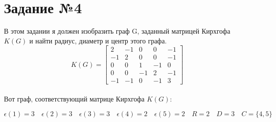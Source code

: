\documentclass[12pt]{article}
\begin{document}
\section*{Задание №4}
В этом задании я должен изобразить граф G, заданный матрицей Кирхгофа $K(G)$
и найти радиус, диаметр и центр этого графа.
\[
K(G) = \begin{bmatrix}
	2 & -1 & 0 & 0 & -1 \\
	-1 & 2 & 0 & 0 & -1 \\
	0 & 0 & 1 & -1 & 0 \\
	0 & 0 & -1 & 2 & -1 \\
	-1 & -1 & 0 & -1 & 3
\end{bmatrix}
\]
\\ Вот граф, соответствующий матрице Кирхгофа $K(G)$: \\
\begin{center}
\end{center}
\[
	\epsilon(1) = 3 \quad \epsilon(2) = 3 \quad \epsilon(3) = 3 \quad
	\epsilon(4) = 2 \quad \epsilon(5) = 2 \quad R = 2 \quad D = 3 \quad
	C = \{4, 5\}
\]

\label{LastPage}
\end{document}
